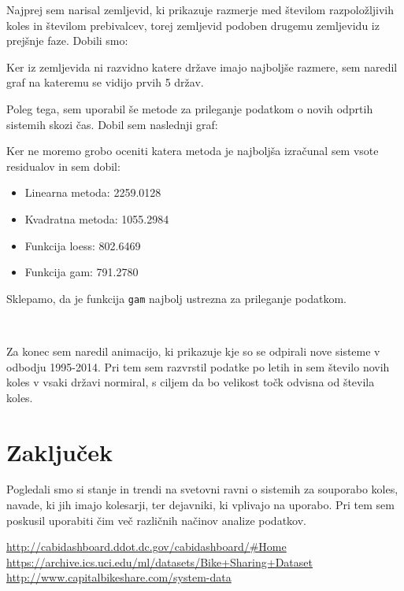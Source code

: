 \documentclass[11pt,a4paper]{article}
\begin{document}
  Najprej sem narisal zemljevid, ki prikazuje razmerje med številom razpoložljivih koles in številom prebivalcev, torej zemljevid podoben drugemu zemljevidu iz prejšnje faze. Dobili smo:
\newpage
\begin{figure}[t]
\end{figure}

\newpage


Ker iz zemljevida ni razvidno katere države imajo najboljše razmere, sem naredil graf na kateremu se vidijo prvih 5 držav. 

Poleg tega, sem uporabil še metode za prileganje podatkom o novih odprtih sistemih skozi čas. Dobil sem naslednji graf:
\begin{figure}[h]
\end{figure}

Ker ne moremo grobo oceniti katera metoda je najboljša izračunal sem vsote residualov in sem dobil:

\begin{itemize}
\item{Linearna metoda: 2259.0128}
\item{Kvadratna metoda: 1055.2984}
\item{Funkcija loess: 802.6469}
\item{Funkcija gam: 791.2780}
\end{itemize}

Sklepamo, da je funkcija \verb|gam| najbolj ustrezna za prileganje podatkom.


\begin{center}
\\
\end{center}

Za konec sem naredil animacijo, ki prikazuje kje so se odpirali nove sisteme v odbodju 1995-2014. Pri tem sem razvrstil podatke po letih in sem število novih koles v vsaki državi normiral, s ciljem da bo velikost točk odvisna od števila koles.


\newpage
\section{Zaključek}

Pogledali smo si stanje in trendi na svetovni ravni o sistemih za souporabo koles, navade, ki jih imajo kolesarji, ter dejavniki, ki vplivajo na uporabo. Pri tem sem poskusil uporabiti čim več različnih načinov analize podatkov.


\newpage
\begin{thebibliography}{3}
  \url{http://cabidashboard.ddot.dc.gov/cabidashboard/#Home}\\
  \url{https://archive.ics.uci.edu/ml/datasets/Bike+Sharing+Dataset}\\
  \url{http://www.capitalbikeshare.com/system-data}\\

\end{thebibliography}
\end{document}
